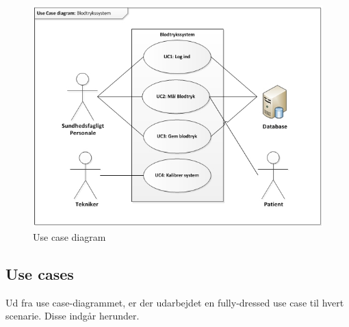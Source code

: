 \begin{figure}[H]
\centering
\includegraphics[scale=0.90]{uc.PNG}
\caption{Use case diagram}
\end{figure}



\subsection{Use cases}
Ud fra use case-diagrammet, er der udarbejdet en fully-dressed use case til hvert scenarie. Disse indgår herunder. 
\\


